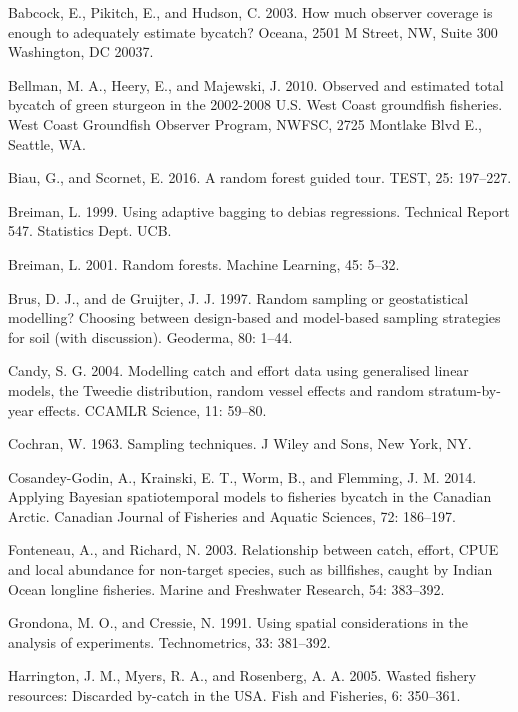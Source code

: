 \documentclass[]{article}
\begin{document}
\hypertarget{ref-babcock2003}{}
Babcock, E., Pikitch, E., and Hudson, C. 2003. How much observer
coverage is enough to adequately estimate bycatch? Oceana, 2501 M
Street, NW, Suite 300 Washington, DC 20037.

\hypertarget{ref-bellman2010}{}
Bellman, M. A., Heery, E., and Majewski, J. 2010. Observed and estimated
total bycatch of green sturgeon in the 2002-2008 U.S. West Coast
groundfish fisheries. West Coast Groundfish Observer Program, NWFSC,
2725 Montlake Blvd E., Seattle, WA.

\hypertarget{ref-biau2016}{}
Biau, G., and Scornet, E. 2016. A random forest guided tour. TEST, 25:
197--227.

\hypertarget{ref-breiman1999}{}
Breiman, L. 1999. Using adaptive bagging to debias regressions.
Technical Report 547. Statistics Dept. UCB.

\hypertarget{ref-breiman2001}{}
Breiman, L. 2001. Random forests. Machine Learning, 45: 5--32.

\hypertarget{ref-brus1997}{}
Brus, D. J., and de Gruijter, J. J. 1997. Random sampling or
geostatistical modelling? Choosing between design-based and model-based
sampling strategies for soil (with discussion). Geoderma, 80: 1--44.

\hypertarget{ref-candy2004}{}
Candy, S. G. 2004. Modelling catch and effort data using generalised
linear models, the Tweedie distribution, random vessel effects and
random stratum-by-year effects. CCAMLR Science, 11: 59--80.

\hypertarget{ref-cochran1963}{}
Cochran, W. 1963. Sampling techniques. J Wiley and Sons, New York, NY.

\hypertarget{ref-cosandey-godin2014}{}
Cosandey-Godin, A., Krainski, E. T., Worm, B., and Flemming, J. M. 2014.
Applying Bayesian spatiotemporal models to fisheries bycatch in the
Canadian Arctic. Canadian Journal of Fisheries and Aquatic Sciences, 72:
186--197.

\hypertarget{ref-fonteneau2003}{}
Fonteneau, A., and Richard, N. 2003. Relationship between catch, effort,
CPUE and local abundance for non-target species, such as billfishes,
caught by Indian Ocean longline fisheries. Marine and Freshwater
Research, 54: 383--392.

\hypertarget{ref-grondona1991}{}
Grondona, M. O., and Cressie, N. 1991. Using spatial considerations in
the analysis of experiments. Technometrics, 33: 381--392.

\hypertarget{ref-harrington2005}{}
Harrington, J. M., Myers, R. A., and Rosenberg, A. A. 2005. Wasted
fishery resources: Discarded by-catch in the USA. Fish and Fisheries, 6:
350--361.
\end{document}
